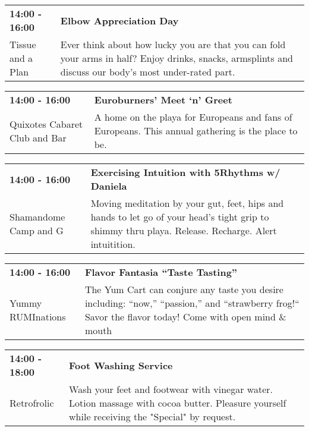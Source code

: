 \begin{tabular}{ p{1in} p{2.2in} }
    \textbf{14:00 - 16:00} & \textbf{Elbow Appreciation Day} \\
    Tissue and a Plan \newline  & Ever think about how lucky you are that you can fold your arms in half? Enjoy drinks, snacks, armsplints and discuss our body's most under-rated part. \\
    \hline 
\end{tabular}
    
\begin{tabular}{ p{1in} p{2.2in} }
    \textbf{14:00 - 16:00} & \textbf{Euroburners' Meet `n' Greet} \\
    Quixotes Cabaret Club and Bar \newline  & A home on the playa for Europeans and fans of Europeans. This annual gathering is the place to be. \\
    \hline 
\end{tabular}
    
\begin{tabular}{ p{1in} p{2.2in} }
    \textbf{14:00 - 16:00} & \textbf{Exercising Intuition with 5Rhythms w/ Daniela } \\
    Shamandome Camp \newline 615 and G & Moving meditation by your gut, feet, hips and hands to let go of your head's tight grip to shimmy thru playa. Release.  Recharge.  Alert intuitition. \\
    \hline 
\end{tabular}
    
\begin{tabular}{ p{1in} p{2.2in} }
    \textbf{14:00 - 16:00} & \textbf{Flavor Fantasia ``Taste Tasting''} \\
    Yummy RUMInations \newline  & The Yum Cart can conjure any taste you desire including: ``now,'' ``passion,'' and ``strawberry frog!`` Savor the flavor today!  Come with open mind \& mouth \\
    \hline 
\end{tabular}
    
\begin{tabular}{ p{1in} p{2.2in} }
    \textbf{14:00 - 18:00} & \textbf{Foot Washing Service} \\
    Retrofrolic \newline  & Wash your feet and footwear with vinegar water.  Lotion massage with cocoa butter. Pleasure yourself while receiving the "Special" by request. \\
    \hline 
\end{tabular}
    
